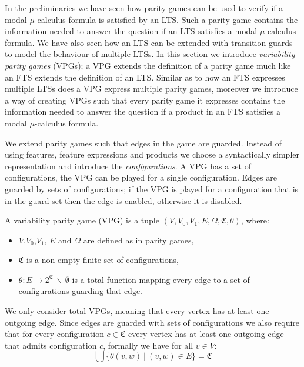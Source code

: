 In the preliminaries we have seen how parity games can be used to verify if a modal $\mu$-calculus formula is satisfied by an LTS. Such a parity game contains the information needed to answer the question if an LTS satisfies a  modal $\mu$-calculus formula. We have also seen how an LTS can be extended with transition guards to model the behaviour of multiple LTSs. In this section we introduce \textit{variability parity games} (VPGs); a VPG extends the definition of a parity game much like an FTS extends the definition of an LTS. Similar as to how an FTS expresses multiple LTSs does a VPG express multiple parity games, moreover we introduce a way of creating VPGs such that every parity game it expresses contains the information needed to answer the question if a product in an FTS satisfies a modal $\mu$-calculus formula.

We extend parity games such that edges in the game are guarded. Instead of using features, feature expressions and products we choose a syntactically simpler representation and introduce the \textit{configurations}. A VPG has a set of configurations, the VPG can be played for a single configuration. Edges are guarded by sets of configurations; if the VPG is played for a configuration that is in the guard set then the edge is enabled, otherwise it is disabled.

\begin{definition}
	\label{def_VPG}
	A variability parity game (VPG) is a tuple $(V,V_0, V_1, E, \Omega, \mathfrak{C}, \theta)$, where:
	\begin{itemize}
		\item $V$,$V_0$,$V_1$, $E$ and $\Omega$ are defined as in parity games,
		\item $\mathfrak{C}$ is a non-empty finite set of configurations,
		\item $\theta : E \rightarrow 2^\mathfrak{C}\ \backslash\ \emptyset$ is a total function mapping every edge to a set of configurations guarding that edge.
	\end{itemize}
\end{definition}
We only consider total VPGs, meaning that every vertex has at least one outgoing edge. Since edges are guarded with sets of configurations we also require that for every configuration $c \in \mathfrak{C}$ every vertex has at least one outgoing edge that admits configuration $c$, formally we have for all $v \in V$:
\[ \bigcup\{\theta(v,w)\ |\ (v,w) \in E\} = \mathfrak{C} \]









